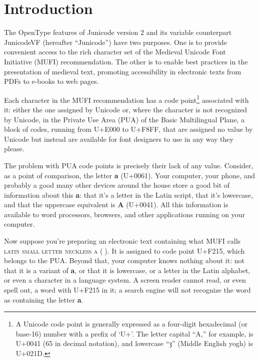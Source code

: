 \documentclass[letterpaper,12pt]{article}
\newcommand\textLetterExample[1]{\textrm{\textbf{\color{BrickRed}#1}}}
\newcommand\textUName[1]{\textsc{#1}}
\begin{document}
\section{Introduction}
\hypertarget{intro}{}The OpenType features of Junicode version 2 and its variable counterpart JunicodeVF (hereafter
``Junicode'') have two purposes. One is to provide convenient access to the rich character set of the Medieval Unicode
Font Initiative (MUFI) recommendation. The other is to enable best practices in the presentation of medieval text,
promoting accessibility in electronic texts from PDFs to e-books to web pages.

Each character in the MUFI recommendation has a code point\footnote{A Unicode code point is generally expressed as a
four-digit hexadecimal (or base-16) number with a prefix of `U+'. The letter capital ``A,'' for example, is U+0041 (65
in decimal notation), and lowercase ``ȝ'' (Middle English yogh) is U+021D.} associated with it: either the one
assigned by Unicode or, where the character is not recognized by Unicode, in the Private Use Area (PUA) of the Basic
Multilingual Plane, a block of codes, running from U+E000 to U+F8FF, that are assigned no value by Unicode but instead
are available for font designers to use in any way they please.

The problem with PUA code points is precisely their lack of any value. Consider, as a point of comparison, the letter
\textLetterExample{a} (U+0061). Your computer, your phone, and probably a good many other devices around the house
store a good bit of information about this \textLetterExample{a}: that it's a letter in the Latin script, that
it's lowercase, and that the uppercase equivalent is \textLetterExample{A} (U+0041). All this information is
available to word processors, browsers, and other applications running on your computer.

Now suppose you're preparing an electronic text containing what MUFI calls \textUName{latin small letter neckless
a} (\textLetterExample{}). It is assigned to code point U+F215, which belongs to the PUA. Beyond that, your
computer knows nothing about it: not that it is a variant of \textLetterExample{a}, or that it is lowercase, or a letter in the Latin
alphabet, or even a character in a language system. A screen reader cannot read, or even spell out, a word with U+F215
in it; a search engine will not recognize the word as containing the letter \textLetterExample{a}.
\end{document}
